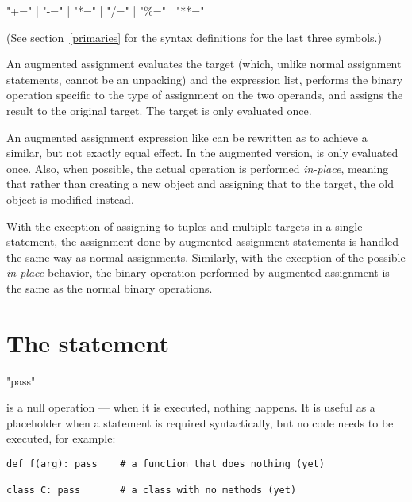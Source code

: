 \begin{productionlist}
             {  }
             {"+=" | "-=" | "*=" | "/=" | "\%=" | "**="}
\end{productionlist}

(See section~\ref{primaries} for the syntax definitions for the last
three symbols.)

An augmented assignment evaluates the target (which, unlike normal
assignment statements, cannot be an unpacking) and the expression
list, performs the binary operation specific to the type of assignment
on the two operands, and assigns the result to the original
target.  The target is only evaluated once.

An augmented assignment expression like  can be rewritten as
 to achieve a similar, but not exactly equal effect. In the
augmented version,  is only evaluated once. Also, when possible, the
actual operation is performed \emph{in-place}, meaning that rather than
creating a new object and assigning that to the target, the old object is
modified instead.

With the exception of assigning to tuples and multiple targets in a single
statement, the assignment done by augmented assignment statements is handled
the same way as normal assignments. Similarly, with the exception of the
possible \emph{in-place} behavior, the binary operation performed by
augmented assignment is the same as the normal binary operations.


\section{The  statement \label{pass}}

\begin{productionlist}
             {"pass"}
\end{productionlist}

 is a null operation --- when it is executed, nothing
happens.  It is useful as a placeholder when a statement is
required syntactically, but no code needs to be executed, for example:

\begin{verbatim}
def f(arg): pass    # a function that does nothing (yet)

class C: pass       # a class with no methods (yet)
\end{verbatim}


